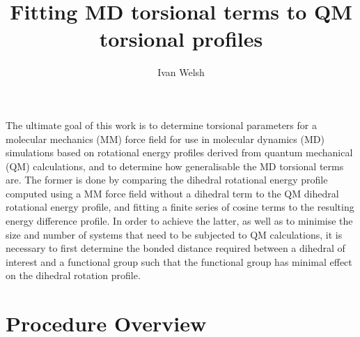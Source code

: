 \documentclass[11pt, oneside]{article}   	%
\title{Fitting MD torsional terms to QM torsional profiles}
\author{Ivan Welsh}
\begin{document}
\maketitle

The ultimate goal of this work is to determine torsional parameters for a molecular mechanics (MM) force field for use in molecular dynamics (MD) simulations based on rotational energy profiles derived from quantum mechanical (QM) calculations, and to determine how generalisable the MD torsional terms are. The former is done by comparing the dihedral rotational energy profile computed using a MM force field without a dihedral term to the QM dihedral rotational energy profile, and fitting a finite series of cosine terms to the resulting energy difference profile. In order to achieve the latter, as well as to minimise the size and number of systems that need to be subjected to QM calculations, it is necessary to first determine the bonded distance required between a dihedral of interest and a functional group such that the functional group has minimal effect on the dihedral rotation profile.\\

\section{Procedure Overview}
\end{document}
